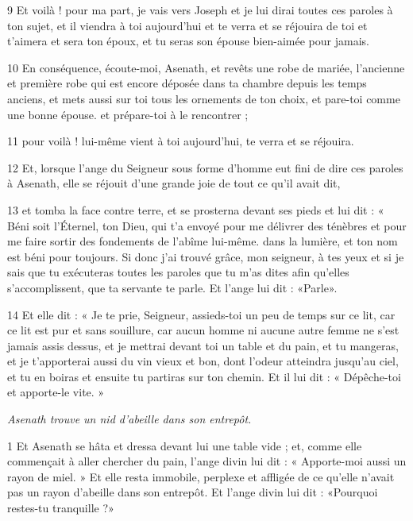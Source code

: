 \par 9 Et voilà ! pour ma part, je vais vers Joseph et je lui dirai toutes ces paroles à ton sujet, et il viendra à toi aujourd'hui et te verra et se réjouira de toi et t'aimera et sera ton époux, et tu seras son épouse bien-aimée pour jamais.

\par 10 En conséquence, écoute-moi, Asenath, et revêts une robe de mariée, l'ancienne et première robe qui est encore déposée dans ta chambre depuis les temps anciens, et mets aussi sur toi tous les ornements de ton choix, et pare-toi comme une bonne épouse. et prépare-toi à le rencontrer ;

\par 11 pour voilà ! lui-même vient à toi aujourd'hui, te verra et se réjouira.

\par 12 Et, lorsque l'ange du Seigneur sous forme d'homme eut fini de dire ces paroles à Asenath, elle se réjouit d'une grande joie de tout ce qu'il avait dit,

\par 13 et tomba la face contre terre, et se prosterna devant ses pieds et lui dit : « Béni soit l'Éternel, ton Dieu, qui t'a envoyé pour me délivrer des ténèbres et pour me faire sortir des fondements de l'abîme lui-même. dans la lumière, et ton nom est béni pour toujours. Si donc j'ai trouvé grâce, mon seigneur, à tes yeux et si je sais que tu exécuteras toutes les paroles que tu m'as dites afin qu'elles s'accomplissent, que ta servante te parle. Et l'ange lui dit : «Parle».

\par 14 Et elle dit : « Je te prie, Seigneur, assieds-toi un peu de temps sur ce lit, car ce lit est pur et sans souillure, car aucun homme ni aucune autre femme ne s'est jamais assis dessus, et je mettrai devant toi un table et du pain, et tu mangeras, et je t'apporterai aussi du vin vieux et bon, dont l'odeur atteindra jusqu'au ciel, et tu en boiras et ensuite tu partiras sur ton chemin. Et il lui dit : « Dépêche-toi et apporte-le vite. »


\par \textit{Asenath trouve un nid d'abeille dans son entrepôt.}

\par 1 Et Asenath se hâta et dressa devant lui une table vide ; et, comme elle commençait à aller chercher du pain, l'ange divin lui dit : « Apporte-moi aussi un rayon de miel. » Et elle resta immobile, perplexe et affligée de ce qu'elle n'avait pas un rayon d'abeille dans son entrepôt. Et l'ange divin lui dit : «Pourquoi restes-tu tranquille ?»

